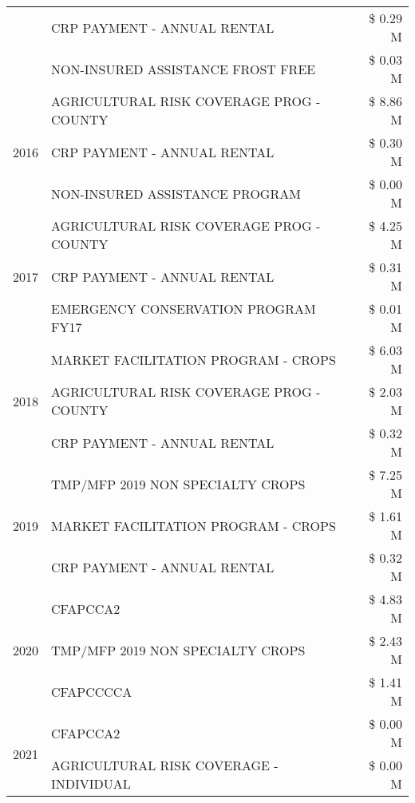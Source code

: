 \begin{tabular}{llr}
 & CRP PAYMENT - ANNUAL RENTAL & \$ 0.29 M \\
 & NON-INSURED ASSISTANCE FROST FREE & \$ 0.03 M \\
\cline{1-3}
\multirow[t]{3}{*}{2016} & AGRICULTURAL RISK COVERAGE PROG - COUNTY      & \$ 8.86 M \\
 & CRP PAYMENT - ANNUAL RENTAL                   & \$ 0.30 M \\
 & NON-INSURED ASSISTANCE PROGRAM                & \$ 0.00 M \\
\cline{1-3}
\multirow[t]{3}{*}{2017} & AGRICULTURAL RISK COVERAGE PROG - COUNTY & \$ 4.25 M \\
 & CRP PAYMENT - ANNUAL RENTAL & \$ 0.31 M \\
 & EMERGENCY CONSERVATION PROGRAM FY17 & \$ 0.01 M \\
\cline{1-3}
\multirow[t]{3}{*}{2018} & MARKET FACILITATION PROGRAM - CROPS & \$ 6.03 M \\
 & AGRICULTURAL RISK COVERAGE PROG - COUNTY & \$ 2.03 M \\
 & CRP PAYMENT - ANNUAL RENTAL & \$ 0.32 M \\
\cline{1-3}
\multirow[t]{3}{*}{2019} & TMP/MFP 2019 NON SPECIALTY CROPS & \$ 7.25 M \\
 & MARKET FACILITATION PROGRAM - CROPS & \$ 1.61 M \\
 & CRP PAYMENT - ANNUAL RENTAL & \$ 0.32 M \\
\cline{1-3}
\multirow[t]{3}{*}{2020} & CFAPCCA2 & \$ 4.83 M \\
 & TMP/MFP 2019 NON SPECIALTY CROPS & \$ 2.43 M \\
 & CFAPCCCCA & \$ 1.41 M \\
\cline{1-3}
\multirow[t]{2}{*}{2021} & CFAPCCA2 & \$ 0.00 M \\
 & AGRICULTURAL RISK COVERAGE - INDIVIDUAL & \$ 0.00 M \\
\cline{1-3}
\bottomrule
\end{tabular}
